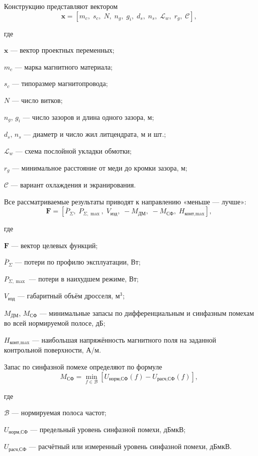 \documentclass[14pt,a4paper]{extarticle}
\newenvironment{whereblock}
 {\par\noindent где\par
  \begin{list}{}{\setlength{\leftmargin}{12.5mm}
                  \setlength{\itemindent}{-12.5mm}
                  \setlength{\itemsep}{0pt}
                  \setlength{\parsep}{0pt}
                  \setlength{\topsep}{0pt}}}
 {\end{list}}
\newcommand{\whereitem}[2]{\item[] #1 --- #2}
\begin{document}
Конструкцию представляют вектором
\begin{equation}
 \mathbf x=
 [m_c,\;s_c,\;N,\;n_g,\;g_i,\;d_s,\;n_s,\;
 \mathcal L_w,\;r_g,\;\mathcal C],
 \label{eq:design-vector}
\end{equation}
\begin{whereblock}
\whereitem{$\mathbf x$}{вектор проектных переменных;}
\whereitem{$m_c$}{марка магнитного материала;}
\whereitem{$s_c$}{типоразмер магнитопровода;}
\whereitem{$N$}{число витков;}
\whereitem{$n_g$, $g_i$}{число зазоров и длина одного зазора, м;}
\whereitem{$d_s$, $n_s$}{диаметр и число жил литцендрата, м и шт.;}
\whereitem{$\mathcal L_w$}{схема послойной укладки обмотки;}
\whereitem{$r_g$}{минимальное расстояние от меди до кромки зазора, м;}
\whereitem{$\mathcal C$}{вариант охлаждения и экранирования.}
\end{whereblock}

Все рассматриваемые результаты приводят к направлению «меньше --- лучше»:
\begin{equation}
 \mathbf F=
 \left[
 \overline P_{\Sigma},\;
 P_{\Sigma,\max},\;
 V_{\text{изд}},\;
 -M_{\text{ДМ}},\;
 -M_{\text{СФ}},\;
 H_{\text{конт,max}}
 \right],
 \label{eq:objective-vector}
\end{equation}
\begin{whereblock}
\whereitem{$\mathbf F$}{вектор целевых функций;}
\whereitem{$\overline P_{\Sigma}$}{потери по профилю эксплуатации,
Вт;}
\whereitem{$P_{\Sigma,\max}$}{потери в наихудшем режиме, Вт;}
\whereitem{$V_{\text{изд}}$}{габаритный объём дросселя, м$^3$;}
\whereitem{$M_{\text{ДМ}}$, $M_{\text{СФ}}$}{минимальные запасы по
дифференциальным и синфазным помехам во всей нормируемой полосе, дБ;}
\whereitem{$H_{\text{конт,max}}$}{наибольшая напряжённость магнитного поля
на заданной контрольной поверхности, А/м.}
\end{whereblock}

Запас по синфазной помехе определяют по формуле
\begin{equation}
 M_{\text{СФ}}=
 \min_{f\in\mathcal B}
 \left[
 U_{\text{норм,СФ}}(f)-
 U_{\text{расч,СФ}}(f)
 \right],
 \label{eq:cm-margin}
\end{equation}
\begin{whereblock}
\whereitem{$\mathcal B$}{нормируемая полоса частот;}
\whereitem{$U_{\text{норм,СФ}}$}{предельный уровень синфазной помехи,
дБмкВ;}
\whereitem{$U_{\text{расч,СФ}}$}{расчётный или измеренный уровень
синфазной помехи, дБмкВ.}
\end{whereblock}
\end{document}
